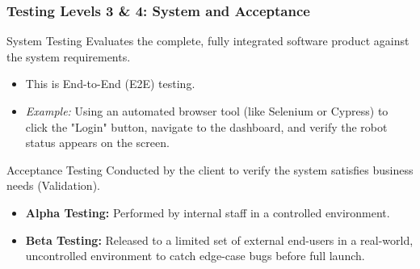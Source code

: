 \documentclass[xcolor=table]{beamer}
\begin{document}
\begin{frame}
    \frametitle{Testing Levels 3 \& 4: System and Acceptance}
    \footnotesize
    \begin{block}{System Testing}
        Evaluates the complete, fully integrated software product against the system requirements.
        \begin{itemize}
            \item This is End-to-End (E2E) testing. 
            \item \textit{Example:} Using an automated browser tool (like Selenium or Cypress) to click the "Login" button, navigate to the dashboard, and verify the robot status appears on the screen.
        \end{itemize}
    \end{block}

    \begin{block}{Acceptance Testing}
        Conducted by the client to verify the system satisfies business needs (Validation).
        \begin{itemize}
            \item \textbf{Alpha Testing:} Performed by internal staff in a controlled environment.
            \item \textbf{Beta Testing:} Released to a limited set of external end-users in a real-world, uncontrolled environment to catch edge-case bugs before full launch.
        \end{itemize}
    \end{block}
\end{frame}
\end{document}
